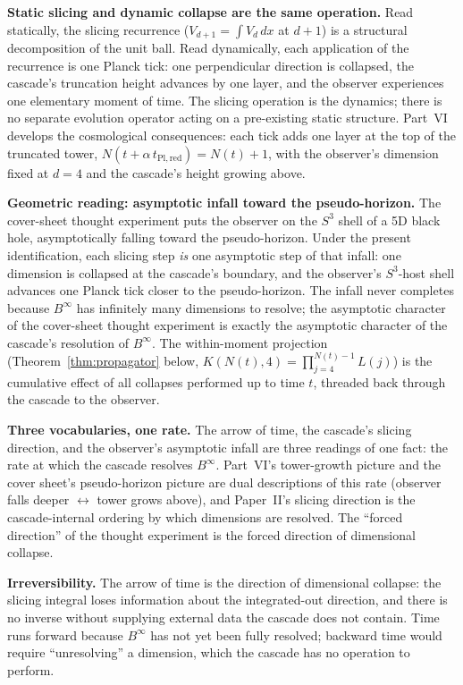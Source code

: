 \documentclass[12pt,a4paper]{article}
\begin{document}
\medskip
\noindent\textbf{Static slicing and dynamic collapse are the same
operation.} Read statically, the slicing recurrence
($V_{d+1} = \int V_d\,dx$ at $d+1$) is a structural decomposition of the
unit ball. Read dynamically, each application of the recurrence is one
Planck tick: one perpendicular direction is collapsed, the cascade's
truncation height advances by one layer, and the observer experiences one
elementary moment of time. The slicing operation is the dynamics; there is
no separate evolution operator acting on a pre-existing static structure.
Part~VI develops the cosmological consequences: each tick
adds one layer at the top of the truncated tower,
$N(t + \alpha\,t_{\mathrm{Pl,red}}) = N(t) + 1$, with the observer's
dimension fixed at $d = 4$ and the cascade's height growing above.

\medskip
\noindent\textbf{Geometric reading: asymptotic infall toward the
pseudo-horizon.} The cover-sheet thought experiment puts the observer on
the $S^3$ shell of a 5D black hole, asymptotically falling toward the
pseudo-horizon. Under the present identification, each slicing step
\emph{is} one asymptotic step of that infall: one dimension is collapsed
at the cascade's boundary, and the observer's $S^3$-host shell advances
one Planck tick closer to the pseudo-horizon. The infall never completes
because $B^\infty$ has infinitely many dimensions to resolve; the
asymptotic character of the cover-sheet thought experiment is exactly the
asymptotic character of the cascade's resolution of $B^\infty$. The
within-moment projection (Theorem~\ref{thm:propagator} below, $K(N(t), 4)
= \prod_{j=4}^{N(t)-1} L(j)$) is the cumulative effect of all collapses
performed up to time $t$, threaded back through the cascade to the
observer.

\medskip
\noindent\textbf{Three vocabularies, one rate.} The arrow of time, the
cascade's slicing direction, and the observer's asymptotic infall are
three readings of one fact: the rate at which the cascade resolves
$B^\infty$. Part~VI's tower-growth picture and the cover
sheet's pseudo-horizon picture are dual descriptions of this rate
(observer falls deeper $\leftrightarrow$ tower grows above), and Paper~II's
slicing direction is the cascade-internal ordering by which dimensions
are resolved. The ``forced direction'' of the thought experiment is the
forced direction of dimensional collapse.

\medskip
\noindent\textbf{Irreversibility.} The arrow of time is the direction of
dimensional collapse: the slicing integral loses information about the
integrated-out direction, and there is no inverse without supplying
external data the cascade does not contain. Time runs forward because
$B^\infty$ has not yet been fully resolved; backward time would require
``unresolving'' a dimension, which the cascade has no operation to
perform.
\end{document}
